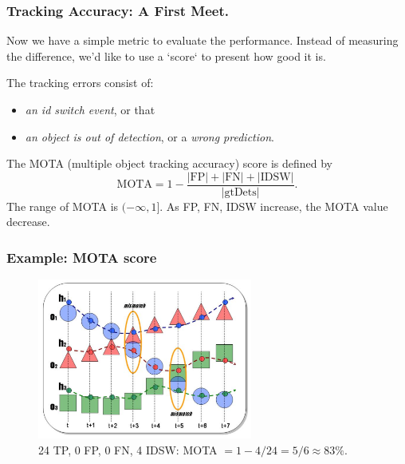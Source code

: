 \documentclass[slidetop, mathserif, dvipsnames]{beamer}
\begin{document}
\begin{frame}
	\frametitle{Tracking Accuracy: A First Meet.}

	Now %
	we have a simple metric to evaluate the performance.
	Instead of measuring the difference,
	we'd like to use a `score` to present how good it is.

	\vspace{3pt}

	The tracking errors consist of:
	\begin{itemize}
	\item \emph{an id switch event}, or that
	\item \emph{an object is out of detection}, or a \emph{wrong prediction}.
	\end{itemize}

	The MOTA (multiple object tracking accuracy) score is defined by
	\[
		\text{MOTA} = 1 - \dfrac{|\text{FP}| + |\text{FN}| + |\text{IDSW}|}{|\text{gtDets}|}.
	\]
	The range of MOTA is $(-\infty,1]$. As FP, FN, IDSW increase, the MOTA value decrease.

\end{frame}

\begin{frame}
	\frametitle{Example: MOTA score}

	\begin{figure}
		\includegraphics[width=200pt]{pics/fig16.png}
		\caption{24 TP, 0 FP, 0 FN, 4 IDSW: MOTA $=1-4/24 = 5/6 \approx 83\%$.}
	\end{figure}
\end{frame}
\end{document}
